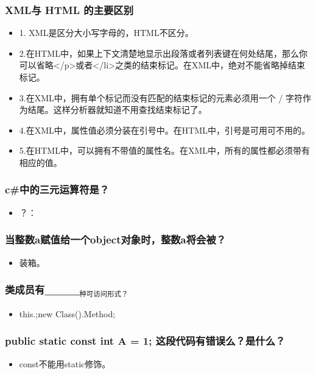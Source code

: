 \documentclass[9pt, b5paper]{article}
\begin{document}
\subsubsection{XML与 HTML 的主要区别}
\label{sec-1-1-77}
\begin{itemize}
\item 1. XML是区分大小写字母的，HTML不区分。
\item 2.在HTML中，如果上下文清楚地显示出段落或者列表键在何处结尾，那么你可以省略</p>或者</li>之类的结束标记。在XML中，绝对不能省略掉结束标记。
\item 3.在XML中，拥有单个标记而没有匹配的结束标记的元素必须用一个 / 字符作为结尾。这样分析器就知道不用查找结束标记了。
\item 4.在XML中，属性值必须分装在引号中。在HTML中，引号是可用可不用的。
\item 5.在HTML中，可以拥有不带值的属性名。在XML中，所有的属性都必须带有相应的值。
\end{itemize}
\subsubsection{c\#中的三元运算符是？}
\label{sec-1-1-78}
\begin{itemize}
\item ？：
\end{itemize}
\subsubsection{当整数a赋值给一个object对象时，整数a将会被？}
\label{sec-1-1-79}
\begin{itemize}
\item 装箱。
\end{itemize}
\subsubsection{类成员有\_\_\_\_$_{\text{种可访问形式？}}$}
\label{sec-1-1-80}
\begin{itemize}
\item this.;new Class().Method;
\end{itemize}
\subsubsection{public static const int A = 1; 这段代码有错误么？是什么？}
\label{sec-1-1-81}
\begin{itemize}
\item const不能用static修饰。
\end{itemize}
\end{document}
